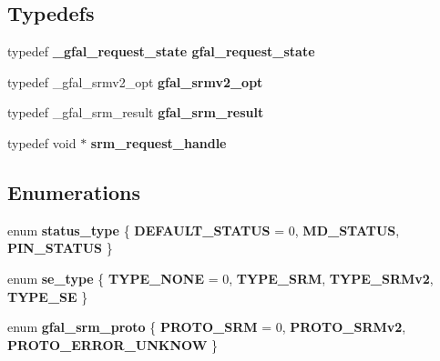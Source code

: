 \subsection*{Typedefs}
\begin{CompactItemize}
\item 
typedef \bf{\_\-gfal\_\-request\_\-state} \bf{gfal\_\-request\_\-state}
\item 
typedef \_\-gfal\_\-srmv2\_\-opt \textbf{gfal\_\-srmv2\_\-opt}\label{gfal__common__srm_8h_a3bcd91e6251d7f36da98c2145fa117b}

\item 
typedef \_\-gfal\_\-srm\_\-result \textbf{gfal\_\-srm\_\-result}\label{gfal__common__srm_8h_9098edc68db720cb1ae7849f51b5191b}

\item 
typedef void $\ast$ \textbf{srm\_\-request\_\-handle}\label{gfal__common__srm_8h_87f5a32879caba96e260c7e70c16888f}

\end{CompactItemize}
\subsection*{Enumerations}
\begin{CompactItemize}
\item 
enum \textbf{status\_\-type} \{ \textbf{DEFAULT\_\-STATUS} =  0, 
\textbf{MD\_\-STATUS}, 
\textbf{PIN\_\-STATUS}
 \}
\item 
enum \textbf{se\_\-type} \{ \textbf{TYPE\_\-NONE} =  0, 
\textbf{TYPE\_\-SRM}, 
\textbf{TYPE\_\-SRMv2}, 
\textbf{TYPE\_\-SE}
 \}
\item 
enum \textbf{gfal\_\-srm\_\-proto} \{ \textbf{PROTO\_\-SRM} = 0, 
\textbf{PROTO\_\-SRMv2}, 
\textbf{PROTO\_\-ERROR\_\-UNKNOW}
 \}
\end{CompactItemize}
